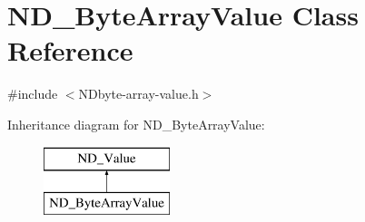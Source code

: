 \hypertarget{class_n_d___byte_array_value}{\section{N\-D\-\_\-\-Byte\-Array\-Value Class Reference}
\label{class_n_d___byte_array_value}
}


{\ttfamily \#include $<$N\-Dbyte-\/array-\/value.\-h$>$}

Inheritance diagram for N\-D\-\_\-\-Byte\-Array\-Value\-:\begin{figure}[H]
\begin{center}
\leavevmode
\includegraphics[height=2.000000cm]{class_n_d___byte_array_value}
\end{center}
\end{figure}

